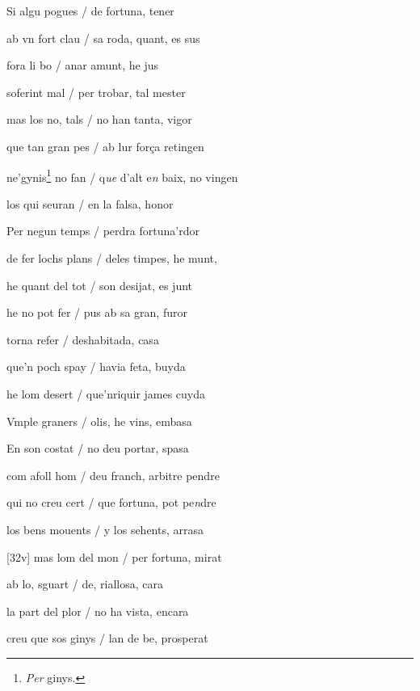 \documentclass[12pt]{article}
\begin{document}
\begin{estrofa}

 Si algu pogues / de fortuna, tener

 ab vn fort clau / sa roda, quant, es sus

 fora li bo / anar amunt, he jus

 soferint mal / per trobar, tal mester

 mas los no, tals / no han tanta, vigor

 que tan gran pes / ab lur for\c{c}a retingen

 ne'gynis\footnote{\textit{Per }ginys.} no fan / q\textit{ue} d'alt e\textit{n}
baix, no vingen

 los qui seuran / en la falsa, honor

\end{estrofa}



\begin{estrofa}

 Per negun temps / perdra fortuna'rdor

 de fer lochs plans / deles timpes, he munt,

 he quant del tot / son desijat, es junt

 he no pot fer / pus ab sa gran, furor

 torna refer / deshabitada, casa

 que'n poch spay / havia feta, buyda

 he lom desert / que'nriquir james cuyda

 Vmple graners / olis, he vins, embasa \cite{ref33}

\end{estrofa}



\begin{estrofa}

 En son costat / no deu portar, spasa

 com afoll hom / deu franch, arbitre pendre

 qui no creu cert / que fortuna, pot pe\textit{n}dre

 los bens mouents / y los sehents, arrasa

 [32v] mas lom del mon / per fortuna, mirat

 ab lo, sguart / de, riallosa, cara

 la part del plor / no ha vista, encara

 creu que sos ginys / lan de be, prosperat

\end{estrofa}
\end{document}
